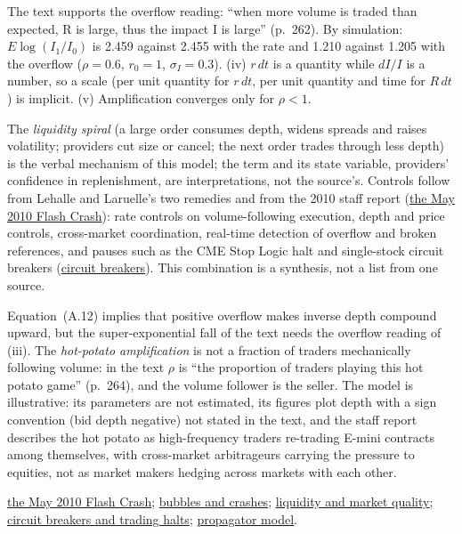 \begin{qfmodel}
The text supports the overflow reading: ``when more volume is traded than expected, R is large, thus the impact I is large'' (p.~262). By simulation: $E\log(I_1/I_0)$ is 2.459 against 2.455 with the rate and 1.210 against 1.205 with the overflow ($\rho=0.6$, $r_0=1$, $\sigma_I=0.3$). (iv) $r\,dt$ is a quantity while $dI/I$ is a number, so a scale (per unit quantity for $r\,dt$, per unit quantity and time for $R\,dt$) is implicit. (v) Amplification converges only for $\rho<1$.

 The \emph{liquidity spiral} (a large order consumes depth, widens spreads and raises volatility; providers cut size or cancel; the next order trades through less depth) is the verbal mechanism of this model; the term and its state variable, providers' confidence in replenishment, are interpretations, not the source's. Controls follow from Lehalle and Laruelle's two remedies and from the 2010 staff report (\hyperref[ev:may-2010-flash-crash]{the May 2010 Flash Crash}): rate controls on volume-following execution, depth and price controls, cross-market coordination, real-time detection of overflow and broken references, and pauses such as the CME Stop Logic halt and single-stock circuit breakers (\hyperref[mech:circuit-breakers-trading-halts]{circuit breakers}). This combination is a synthesis, not a list from one source.

 Equation~(A.12) implies that positive overflow makes inverse depth compound upward, but the super-exponential fall of the text needs the overflow reading of (iii). The \emph{hot-potato amplification} is not a fraction of traders mechanically following volume: in the text $\rho$ is ``the proportion of traders playing this hot potato game'' (p.~264), and the volume follower is the seller. The model is illustrative: its parameters are not estimated, its figures plot depth with a sign convention (bid depth negative) not stated in the text, and the staff report describes the hot potato as high-frequency traders re-trading E-mini contracts among themselves, with cross-market arbitrageurs carrying the pressure to equities, not as market makers hedging across markets with each other.

 \hyperref[ev:may-2010-flash-crash]{the May 2010 Flash Crash}; \hyperref[mech:bubble-crash-dynamics]{bubbles and crashes}; \hyperref[def:liquidity-dimensions]{liquidity and market quality}; \hyperref[mech:circuit-breakers-trading-halts]{circuit breakers and trading halts}; \hyperref[mod:propagator]{propagator model}.

\end{qfmodel}

